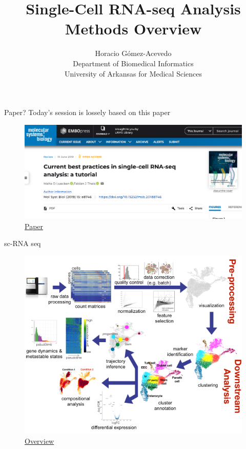 \documentclass{beamer}
\title{Single-Cell RNA-seq Analysis\\ Methods Overview}
\author{Horacio G\'omez-Acevedo\\ Department of Biomedical Informatics\\
	University of Arkansas for Medical Sciences}
\begin{document}
	\begin{frame}[plain]
		\maketitle
	\end{frame}
\begin{frame}{Paper?}
	Today's session is lossely based on this paper
\begin{figure}[h]
	\centering
	\includegraphics[scale=0.25]{../../Figures/Paper.png}
	\caption{\href{https://github.com/theislab/single-cell-tutorial}{Paper}}
\end{figure}	
\end{frame}

	\begin{frame}{sc-RNA seq}
		
\begin{figure}[h]
	\centering
	\includegraphics[scale=0.25]{../../Figures/scrnaseq_overview.png}
	\caption{\href{https://www.embopress.org/doi/full/10.15252/msb.20188746}{Overview}}
\end{figure}
\end{frame}
\end{document}

